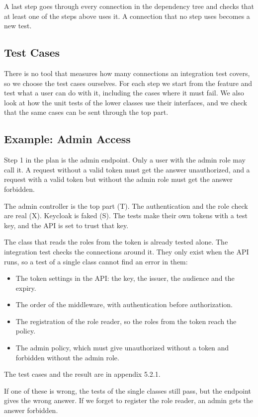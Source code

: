 \documentclass[a4paper,11pt]{article}
\begin{document}
A last step goes through every connection in the dependency tree and checks that at least one of the steps above uses it. A connection that no step uses becomes a new test.

\subsection{Test Cases}
There is no tool that measures how many connections an integration test covers, so we choose the test cases ourselves. For each step we start from the feature and test what a user can do with it, including the cases where it must fail. We also look at how the unit tests of the lower classes use their interfaces, and we check that the same cases can be sent through the top part.

\subsection{Example: Admin Access}
Step 1 in the plan is the admin endpoint. Only a user with the admin role may call it. A request without a valid token must get the answer unauthorized, and a request with a valid token but without the admin role must get the answer forbidden.

The admin controller is the top part (T). The authentication and the role check are real (X). Keycloak is faked (S). The tests make their own tokens with a test key, and the API is set to trust that key.

The class that reads the roles from the token is already tested alone. The integration test checks the connections around it. They only exist when the API runs, so a test of a single class cannot find an error in them:

\begin{itemize}
  \item The token settings in the API: the key, the issuer, the audience and the expiry.
  \item The order of the middleware, with authentication before authorization.
  \item The registration of the role reader, so the roles from the token reach the policy.
  \item The admin policy, which must give unauthorized without a token and forbidden without the admin role.
\end{itemize}

The test cases and the result are in appendix 5.2.1.

If one of these is wrong, the tests of the single classes still pass, but the endpoint gives the wrong answer. If we forget to register the role reader, an admin gets the answer forbidden.
\end{document}
